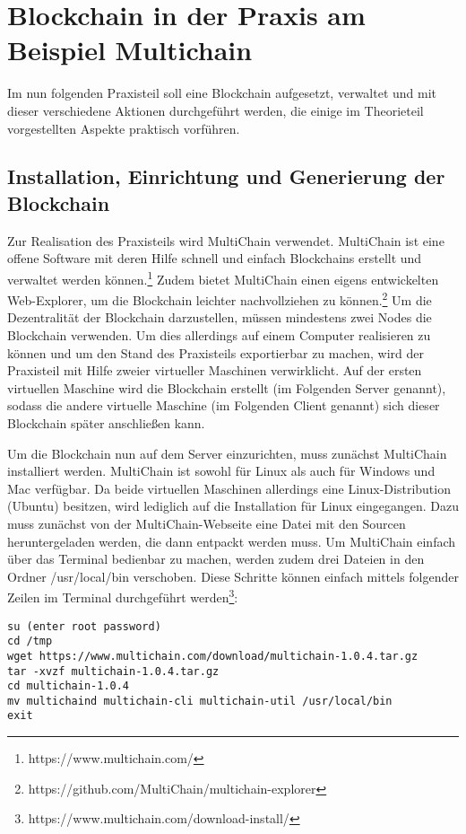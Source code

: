 \section{Blockchain in der Praxis am Beispiel Multichain}
\label{sec:Praxis}
Im nun folgenden Praxisteil soll eine Blockchain aufgesetzt, verwaltet und mit dieser verschiedene Aktionen durchgeführt werden, die einige im Theorieteil vorgestellten Aspekte praktisch vorführen.

\subsection{Installation, Einrichtung und Generierung der Blockchain}
\label{subsec:inst}
Zur Realisation des Praxisteils wird MultiChain verwendet. MultiChain ist eine offene Software mit deren Hilfe schnell und einfach Blockchains erstellt und verwaltet werden können.\footnote{https://www.multichain.com/} Zudem bietet MultiChain einen eigens entwickelten Web-Explorer, um die Blockchain leichter nachvollziehen zu können.\footnote{https://github.com/MultiChain/multichain-explorer} Um die Dezentralität der Blockchain darzustellen, müssen mindestens zwei Nodes die Blockchain verwenden. Um dies allerdings auf einem Computer realisieren zu können und um den Stand des Praxisteils exportierbar zu machen, wird der Praxisteil mit Hilfe zweier virtueller Maschinen verwirklicht. Auf der ersten virtuellen Maschine wird die Blockchain erstellt (im Folgenden Server genannt), sodass die andere virtuelle Maschine (im Folgenden Client genannt) sich dieser Blockchain später anschließen kann.

Um die Blockchain nun auf dem Server einzurichten, muss zunächst MultiChain installiert werden. MultiChain ist sowohl für Linux als auch für Windows und Mac verfügbar. Da beide virtuellen Maschinen allerdings eine Linux-Distribution (Ubuntu) besitzen, wird lediglich auf die Installation für Linux eingegangen. Dazu muss zunächst von der MultiChain-Webseite eine Datei mit den Sourcen heruntergeladen werden, die dann entpackt werden muss. Um MultiChain einfach über das Terminal bedienbar zu machen, werden zudem drei Dateien in den Ordner /usr/local/bin verschoben. Diese Schritte können einfach mittels folgender Zeilen im Terminal durchgeführt werden\footnote{https://www.multichain.com/download-install/}:

\begin{lstlisting}[frame=single]
su (enter root password)
cd /tmp
wget https://www.multichain.com/download/multichain-1.0.4.tar.gz
tar -xvzf multichain-1.0.4.tar.gz
cd multichain-1.0.4
mv multichaind multichain-cli multichain-util /usr/local/bin
exit
\end{lstlisting}

